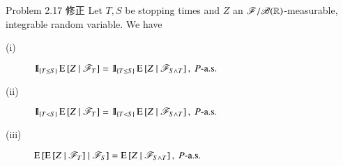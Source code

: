 	\begin{itembox}[l]{Problem 2.17 修正}
		Let $T,S$ be stopping times and $Z$ an $\mathscr{F}/\borel{\R}$-measurable, 
		integrable random variable. We have
		\begin{description}
			\item[(i)] $\defunc_{\{T \leq S\}} \cexp{Z}{\mathscr{F}_T} = \defunc_{\{T \leq S\}} \cexp{Z}{\mathscr{F}_{S \wedge T}},\ \mbox{$P$-a.s.}$
			\item[(ii)] $\defunc_{\{T < S\}} \cexp{Z}{\mathscr{F}_T} = \defunc_{\{T < S\}} \cexp{Z}{\mathscr{F}_{S \wedge T}},\ \mbox{$P$-a.s.}$
			\item[(iii)] $\cexp{\cexp{Z}{\mathscr{F}_T}}{\mathscr{F}_S} = \cexp{Z}{\mathscr{F}_{S \wedge T}},\ \mbox{$P$-a.s.}$
		\end{description}
	\end{itembox}
	
